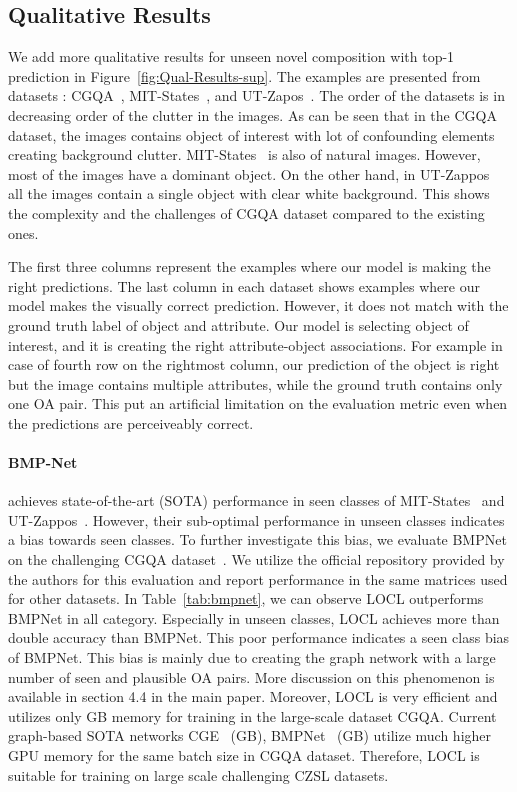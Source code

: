 \documentclass{bmvc2k}
\begin{document}
\subsection{Qualitative Results}
We add more qualitative results for unseen novel composition with top-1 prediction in Figure~\ref{fig:Qual-Results-sup}. The examples are presented from datasets : CGQA~\cite{naeem2021learning}, MIT-States~\cite{isola2015discovering}, and UT-Zapos~\cite{yu2017semantic}. The order of the datasets is in decreasing order of the clutter in the images. As can be seen that in the CGQA dataset, the images contains object of interest with lot of confounding elements creating background clutter. MIT-States~\cite{isola2015discovering} is also of natural images. However, most of the images have a dominant object. On the other hand, in UT-Zappos~\cite{yu2017semantic} all the images contain a single object with clear white background. This shows the complexity and the challenges of CGQA dataset compared to the existing ones. 

The first three columns represent the examples where our model is making the right predictions. The last column in each dataset shows examples where our model makes the visually correct prediction. However, it does not match with the ground truth label of object and attribute. Our model is selecting object of interest, and it is creating the right attribute-object associations. For example in case of fourth row on the rightmost column, our prediction of the object is right but the image contains multiple attributes, while the ground truth contains only one OA pair. This put an artificial limitation on the evaluation metric even when the predictions are perceiveably correct. 

\paragraph{BMP-Net~\cite{xu2021relation}}achieves state-of-the-art (SOTA) performance in seen classes of MIT-States~\cite{misra2017red} and UT-Zappos~\cite{yu2017semantic}. However, their sub-optimal performance in unseen classes indicates a bias towards seen classes. To further investigate this bias, we evaluate BMPNet on the challenging CGQA dataset~\cite{naeem2021learning}. We utilize the official repository provided by the authors for this evaluation and report performance in the same matrices used for other datasets. In Table~\ref{tab:bmpnet}, we can observe LOCL outperforms BMPNet in all category. Especially in unseen classes, LOCL achieves more than double accuracy than BMPNet. This poor performance indicates a seen class bias of BMPNet. This bias is mainly due to creating the graph network with a large number of seen and plausible OA pairs. More discussion on this phenomenon is available in section 4.4 in the main paper. Moreover, LOCL is very efficient and utilizes only GB memory for training in the large-scale dataset CGQA. Current graph-based SOTA networks CGE~\cite{naeem2021learning} (GB), BMPNet~\cite{xu2021relation} (GB) utilize much higher GPU memory for the same batch size in CGQA dataset. Therefore, LOCL is suitable for training on large scale challenging CZSL datasets.
\end{document}
